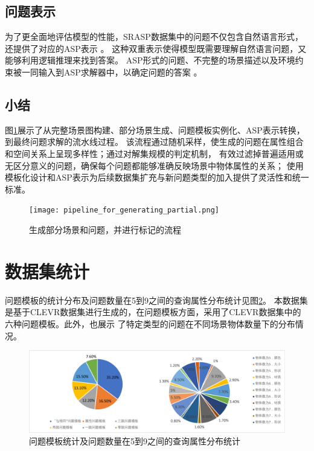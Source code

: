 \subsection{问题表示}
为了更全面地评估模型的性能，SRASP数据集中的问题不仅包含自然语言形式，还提供了对应的ASP表示 。
这种双重表示使得模型既需要理解自然语言问题，又能够利用逻辑推理来找到答案。
ASP形式的问题、不完整的场景描述以及环境约束被一同输入到ASP求解器中，以确定问题的答案 。

\subsection{小结}
图\ref{pipeline_for_generating_partial}展示了从完整场景图构建、部分场景生成、问题模板实例化、ASP表示转换，到最终问题求解的流水线过程。
该流程通过随机采样，使生成的问题在属性组合和空间关系上呈现多样性；通过对解集规模的判定机制，
有效过滤掉普遍适用或无区分意义的问题，确保每个问题都能够准确反映场景中物体属性的关系；
使用模板化设计和ASP表示为后续数据集扩充与新问题类型的加入提供了灵活性和统一标准。
\begin{figure}
    \centering
    \texttt{[image: pipeline\_for\_generating\_partial.png]}
    \caption{生成部分场景和问题，并进行标记的流程}
    \label{pipeline_for_generating_partial}
\end{figure}
\section{数据集统计}
问题模板的统计分布及问题数量在5到9之间的查询属性分布统计见图\ref{fig:template_statistics}。
本数据集是基于CLEVR数据集进行生成的，在问题模板方面，采用了CLEVR数据集中的六种问题模板。此外，也展示
了特定类型的问题在不同场景物体数量下的分布情况。
\begin{figure}
    \includegraphics[width=\textwidth]{figures/template_combined-crop.pdf}
    \caption{问题模板统计及问题数量在5到9之间的查询属性分布统计}
    \label{fig:template_statistics}
\end{figure}


